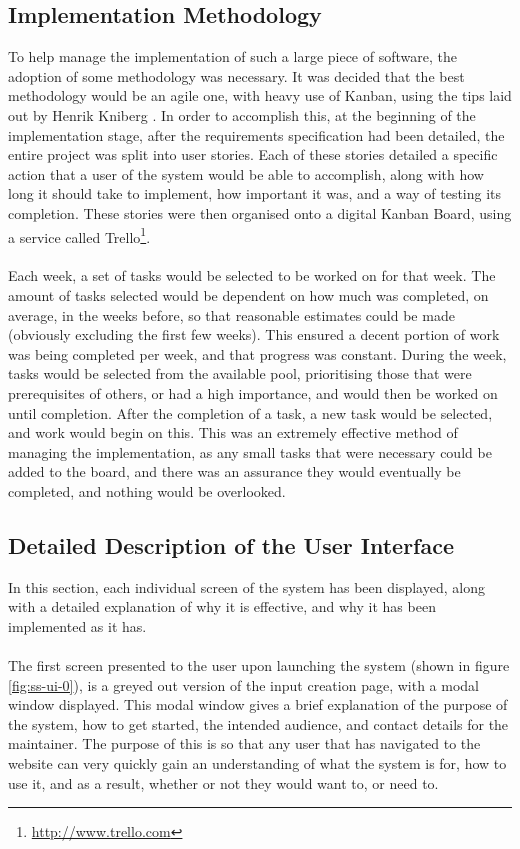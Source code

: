 \subsection{Implementation Methodology}
To help manage the implementation of such a large piece of software, the adoption of some methodology was necessary. It was decided that the best methodology would be an agile one, with heavy use of Kanban, using the tips laid out by Henrik Kniberg \cite{kniberg2007scrum}. In order to accomplish this, at the beginning of the implementation stage, after the requirements specification had been detailed, the entire project was split into user stories. Each of these stories detailed a specific action that a user of the system would be able to accomplish, along with how long it should take to implement, how important it was, and a way of testing its completion. These stories were then organised onto a digital Kanban Board, using a service called Trello\footnote{\url{http://www.trello.com}}. \ \\
\ \\
Each week, a set of tasks would be selected to be worked on for that week. The amount of tasks selected would be dependent on how much was completed, on average, in the weeks before, so that reasonable estimates could be made (obviously excluding the first few weeks). This ensured a decent portion of work was being completed per week, and that progress was constant. During the week, tasks would be selected from the available pool, prioritising those that were prerequisites of others, or had a high importance, and would then be worked on until completion. After the completion of a task, a new task would be selected, and work would begin on this. This was an extremely effective method of managing the implementation, as any small tasks that were necessary could be added to the board, and there was an assurance they would eventually be completed, and nothing would be overlooked.

\newpage 
\subsection{Detailed Description of the User Interface}
In this section, each individual screen of the system has been displayed, along with a detailed explanation of why it is effective, and why it has been implemented as it has.\ \\
\ \\
The first screen presented to the user upon launching the system (shown in figure \ref{fig:ss-ui-0}), is a greyed out version of the input creation page, with a modal window displayed. This modal window gives a brief explanation of the purpose of the system, how to get started, the intended audience, and contact details for the maintainer. The purpose of this is so that any user that has navigated to the website can very quickly gain an understanding of what the system is for, how to use it, and as a result, whether or not they would want to, or need to.


